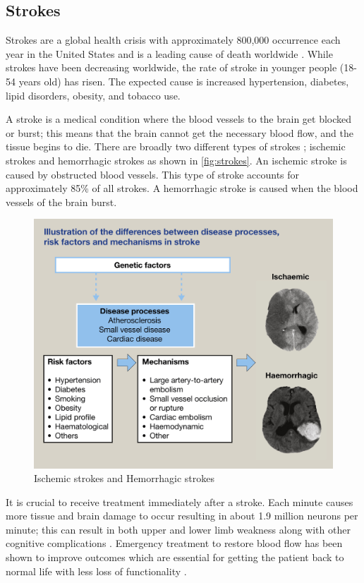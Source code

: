 \subsection{Strokes}
Strokes are a global health crisis with approximately 800,000 occurrence each year in the United States and is a leading cause of death worldwide \cite{george2017cdc} \cite{murphy2020stroke} \cite{feigin2015update}. While strokes have been decreasing worldwide, the rate of stroke in younger people (18-54 years old) has risen. The expected cause is increased hypertension, diabetes, lipid disorders, obesity, and tobacco use. 

A stroke is a medical condition where the blood vessels to the brain get blocked or burst; this means that the brain cannot get the necessary blood flow, and the tissue begins to die. There are broadly two different types of strokes \cite{perna2015rehabilitation}; ischemic strokes and hemorrhagic strokes as shown in \autoref{fig:strokes}.  An ischemic stroke is caused by obstructed blood vessels. This type of stroke accounts for approximately 85\% of all strokes. A hemorrhagic stroke is caused when the blood vessels of the brain burst.  

\begin{figure}
    \centering
    \includegraphics[scale=0.85]{images/background/stroke.jpg}
    \caption[Ischemic strokes and Hemorrhagic strokes]{Ischemic strokes and Hemorrhagic strokes \cite{murphy2020stroke}}
    \label{fig:strokes}
\end{figure}


It is crucial to receive treatment immediately after a stroke. Each minute causes more tissue and brain damage to occur \cite{saver2006time} resulting in about 1.9 million neurons per minute; this can result in both upper and lower limb weakness along with other cognitive complications \cite{pennycott2012towards}.  Emergency treatment to restore blood flow has been shown to improve outcomes which are essential for getting the patient back to normal life with less loss of functionality \cite{goyal2016endovascular}.  